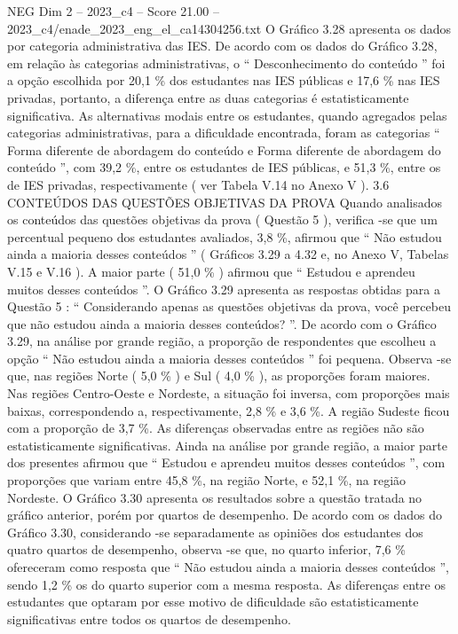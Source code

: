 \begin{textsample}{NEG Dim 2 – 2023\_c4 – Score 21.00 – 2023\_c4/enade\_2023\_eng\_el\_ca14304256.txt}
O Gráfico 3.28 apresenta os dados por categoria administrativa das IES.
De acordo com os dados do Gráfico 3.28, em relação às categorias administrativas, o “ Desconhecimento do conteúdo ” foi a opção escolhida por 20,1 \% dos estudantes nas IES públicas e 17,6 \% nas IES privadas, portanto, a diferença entre as duas categorias é estatisticamente significativa.
As alternativas modais entre os estudantes, quando agregados pelas categorias administrativas, para a dificuldade encontrada, foram as categorias “ Forma diferente de abordagem do conteúdo e Forma diferente de abordagem do conteúdo ”, com 39,2 \%, entre os estudantes de IES públicas, e 51,3 \%, entre os de IES privadas, respectivamente ( ver Tabela V.14 no Anexo V ). 3.6 CONTEÚDOS DAS QUESTÕES OBJETIVAS DA PROVA Quando analisados os conteúdos das questões objetivas da prova ( Questão 5 ), verifica -se que um percentual pequeno dos estudantes avaliados, 3,8 \%, afirmou que “ Não estudou ainda a maioria desses conteúdos ” ( Gráficos 3.29 a 4.32 e, no Anexo V, Tabelas V.15 e V.16 ).
A maior parte ( 51,0 \% ) afirmou que “ Estudou e aprendeu muitos desses conteúdos ”.
O Gráfico 3.29 apresenta as respostas obtidas para a Questão 5 : “ Considerando apenas as questões objetivas da prova, você percebeu que não estudou ainda a maioria desses conteúdos? ”.
De acordo com o Gráfico 3.29, na análise por grande região, a proporção de respondentes que escolheu a opção “ Não estudou ainda a maioria desses conteúdos ” foi pequena.
Observa -se que, nas regiões Norte ( 5,0 \% ) e Sul ( 4,0 \% ), as proporções foram maiores.
Nas regiões Centro-Oeste e Nordeste, a situação foi inversa, com proporções mais baixas, correspondendo a, respectivamente, 2,8 \% e 3,6 \%.
A região Sudeste ficou com a proporção de 3,7 \%.
As diferenças observadas entre as regiões não são estatisticamente significativas.
Ainda na análise por grande região, a maior parte dos presentes afirmou que “ Estudou e aprendeu muitos desses conteúdos ”, com proporções que variam entre 45,8 \%, na região Norte, e 52,1 \%, na região Nordeste.
O Gráfico 3.30 apresenta os resultados sobre a questão tratada no gráfico anterior, porém por quartos de desempenho.
De acordo com os dados do Gráfico 3.30, considerando -se separadamente as opiniões dos estudantes dos quatro quartos de desempenho, observa -se que, no quarto inferior, 7,6 \% ofereceram como resposta que “ Não estudou ainda a maioria desses conteúdos ”, sendo 1,2 \% os do quarto superior com a mesma resposta.
As diferenças entre os estudantes que optaram por esse motivo de dificuldade são estatisticamente significativas entre todos os quartos de desempenho.

\end{textsample}
